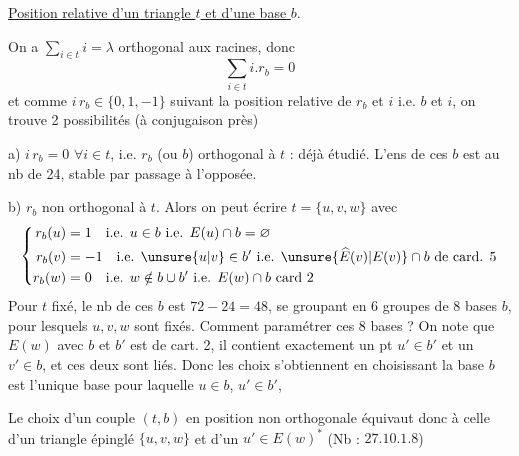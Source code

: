 \uline{Position relative d'un triangle $t$ et d'une base $b$}.

On a $\sum_{i\in t}i=\lambda$ orthogonal aux racines, donc
\[
\sum_{i\in t}i.r_b=0
\]
et comme $i\,r_b\in\{0,1,-1\}$ suivant la position relative de $r_b$ et $i$ i.e.  $b$ et $i$, on trouve 2 possibilités (à conjugaison près)

a) $i\,r_b=0$ $\forall i\in t$, i.e.  $r_b$ (ou $b$) orthogonal à $t$ : déjà étudié. L'ens de ces $b$ est au nb de 24, stable par passage à l'opposée.

b) \deleted{\unsure{\#|$\exists$}} $r_b$ non orthogonal à $t$. Alors on peut écrire $t=\{u,v,w\}$ avec
\[
\left\{\begin{aligned}
r_b(u)&=1\quad\text{i.e. }u\in b\ \text{i.e. }E(u)\cap b=\varnothing\\
r_b(v)&=-1\quad\text{i.e. }\unsure{u|v}\in b'\ \text{i.e. }\unsure{\widehat E(v)|E(v)}\cap b\ \text{de card. }5\\
r_b(w)&=0\quad\text{i.e. }w\notin b\cup b'\ \text{i.e. }E(w)\cap b\ \text{card }2
\end{aligned}\right.
\]
Pour $t$ fixé, le nb de ces $b$ est $72-24=48$, se groupant en 6 groupes de 8 bases $b$, pour lesquels $u,v,w$ sont fixés. Comment paramétrer ces 8 bases ? On note que  $E(w)$ avec $b$ et $b'$ est de cart. 2, il contient exactement un pt $u'\in b'$ et un $v'\in b$, et ces deux sont liés. Donc les  choix s'obtiennent en choisissant  la base $b$ est l'unique base  pour laquelle $u\in b$, $u'\in b'$,

Le choix d'un couple $(t,b)$ en position non orthogonale équivaut donc à celle d'un triangle épinglé $\{u,v,w\}$ et d'un $u'\in E(w)^*$ (Nb : $27.10.1.8$)
